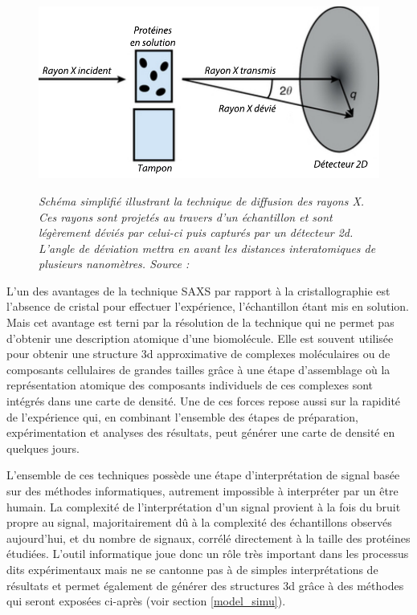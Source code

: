 \begin{figure}[htb]
  \centering
  {\includegraphics[width=0.6\linewidth]{./figures/ch1/saxs.pdf}}
    \caption[Schéma de la technique de diffusion des rayons X - SAXS.]{\it Schéma simplifié illustrant la technique de diffusion des rayons X. Ces rayons sont projetés au travers d'un échantillon et sont légèrement déviés par celui-ci puis capturés par un détecteur 2d. L'angle de déviation mettra en avant les distances interatomiques de plusieurs nanomètres. Source : \cite{skou2014synchrotron}}
    \label{Fig:saxs}
\end{figure}

L'un des avantages de la technique SAXS par rapport à la cristallographie est l'absence de cristal pour effectuer l'expérience, l'échantillon étant mis en solution. Mais cet avantage est terni par la résolution de la technique qui ne permet pas d'obtenir une description atomique d'une biomolécule. Elle est souvent utilisée pour obtenir une structure 3d approximative de complexes moléculaires ou de composants cellulaires de grandes tailles grâce à une étape d'assemblage où la représentation atomique des composants individuels de ces complexes sont intégrés dans une carte de densité. Une de ces forces repose aussi sur la rapidité de l'expérience qui, en combinant l'ensemble des étapes de préparation, expérimentation et analyses des résultats, peut générer une carte de densité en quelques jours.

L'ensemble de ces techniques possède une étape d'interprétation de signal basée sur des méthodes informatiques, autrement impossible à interpréter par un être humain. La complexité de l'interprétation d'un signal provient à la fois du bruit propre au signal, majoritairement dû à la complexité des échantillons observés aujourd'hui, et du nombre de signaux, corrélé directement à la taille des protéines étudiées. L'outil informatique joue donc un rôle très important dans les processus dits expérimentaux mais ne se cantonne pas à de simples interprétations de résultats et permet également de générer des structures 3d grâce à des méthodes qui seront exposées ci-après (voir section \ref{model_simu}).




